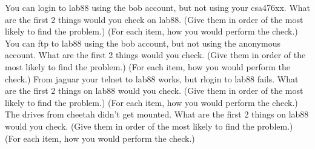 \ques
You can login to {\ltt{}lab88} using the
{\ltt{}bob} account, but not using your {\ltt{}csa476xx}.
What are the first 2 things would you check on {\ltt{}lab88}.
(Give them in order of the most likely to find the problem.)
(For each item, how you would perform the check.)
\vfill
\ques
You can ftp to {\ltt{}lab88} using the {\ltt{}bob} account,
but not using the anonymous account.
What are the first 2 things would you check.
(Give them in order of the most likely to find the problem.)
(For each item, how you would perform the check.)
\vfill
\ques
From {\ltt{}jaguar} your telnet to {\ltt{}lab88} works, but
rlogin to {\ltt{}lab88} fails.
What are the first 2 things on {\ltt{}lab88} would you check.
(Give them in order of the most likely to find the problem.)
(For each item, how you would perform the check.)
\vfill
\ques
The drives from {\ltt{}cheetah} didn't get mounted.
What are the first 2 things on {\ltt{}lab88} would you check.
(Give them in order of the most likely to find the problem.)
(For each item, how you would perform the check.)
\bye
